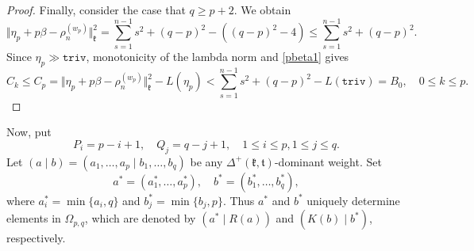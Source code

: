 \documentclass[11pt]{amsart}
\theoremstyle{plain}
\theoremstyle{definition}
\newcommand{\frk}{\mathfrak{k}}
\newcommand{\frt}{\mathfrak{t}}
\begin{document}
\begin{proof}
Finally, consider the case that $q\ge p+2$. We obtain
	\[\Vert\eta_p+p\beta-\rho_n^{(w_p)}\Vert_\frk^2=\sum_{s=1}^{n-1}s^2+(q-p)^2-((q-p)^2-4)\le \sum_{s=1}^{n-1}s^2+(q-p)^2.\]
	Since $\eta_p\gg\texttt{triv}$, monotonicity of the lambda norm and \eqref{pbeta1} gives
	\[C_k\le C_p=\Vert\eta_p+p\beta-\rho_n^{(w_p)}\Vert_\frk^2- L(\eta_p)< \sum_{s=1}^{n-1}s^2+(q-p)^2-L(\texttt{triv})=B_0,\quad 0\le k\le p.\]
\end{proof}


Now, put
\[P_i=p-i+1,\quad Q_j=q-j+1,\quad 1\le i\le p,1\le j\le q.\]
Let $(a\mid b)=(a_1, \dots, a_p \mid b_1, \dots, b_q)$ be any $\Delta^+(\frk,\frt)$-dominant weight. Set
$$
a^*=(a_1^*, \dots, a_p^*), \quad b^*=(b_1^*, \dots, b_q^*),
$$
where $a_i^*=\min\{a_i, q\}$ and $b_j^*=\min\{b_j, p\}$.
Thus $a^*$ and $b^*$ uniquely determine elements in $\Omega_{p, q}$, which are denoted by
$(a^*\mid R(a))$ and $(K(b)\mid b^*)$, respectively.
\end{document}
